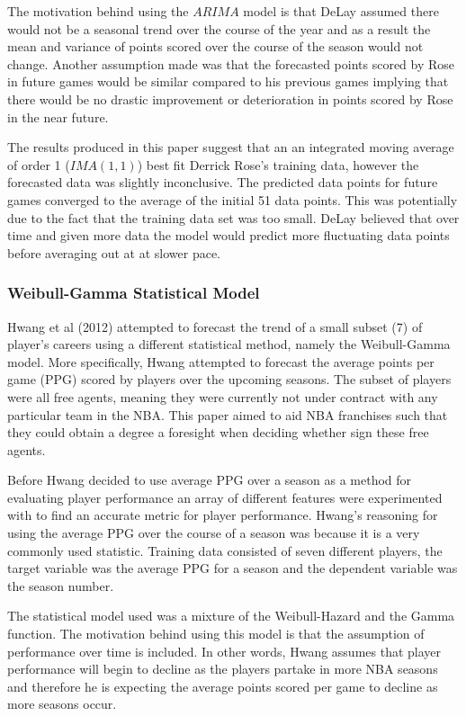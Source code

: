 \documentclass[a4paper,11pt,twoside]{article}
\begin{document}
The motivation behind using the $ARIMA$ model is that DeLay assumed there would not be a seasonal trend over the course of the year and as a result the mean and variance of points scored over the course of the season would not change. Another assumption made was that the forecasted points scored by Rose in future games would be similar compared to his previous games implying that there would be no drastic improvement or deterioration in points scored by Rose in the near future.

The results produced in this paper suggest that an an integrated moving average of order 1 ($IMA(1,1)$) best fit Derrick Rose's training data, however the forecasted data was slightly inconclusive. The predicted data points for future games converged to the average of the initial 51 data points. This was potentially due to the fact that the training data set was too small. DeLay believed that over time and given more data the model would predict more fluctuating data points before averaging out at at slower pace. 


\subsubsection{Weibull-Gamma Statistical Model}

Hwang et al (2012) attempted to forecast the trend of a small subset (7) of player's careers using a different statistical method, namely the Weibull-Gamma model. More specifically, Hwang attempted to forecast the average points per game (PPG) scored by players over the upcoming seasons. The subset of players were all free agents, meaning they were currently not under contract with any particular team in the NBA. This paper aimed to aid NBA franchises such that they could obtain a degree a foresight when deciding whether sign these free agents.


Before Hwang decided to use average PPG over a season as a method for evaluating player performance an array of different features were experimented with to find an accurate metric for player performance. Hwang's reasoning for using the average PPG over the course of a season was because it is a very commonly used statistic. Training data consisted of seven different players, the target variable was the average PPG for a season and the dependent variable was the season number. 

The statistical model used was a mixture of the Weibull-Hazard and the Gamma function. The motivation behind using this model is that the assumption of performance over time is included. In other words, Hwang assumes that player performance will begin to decline as the players partake in more NBA seasons and therefore he is expecting the average points scored per game to decline as more seasons occur.
\end{document}
